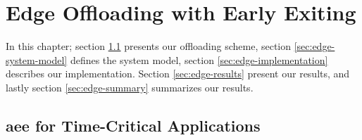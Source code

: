 \hypertarget{earlyexiting}{%
	\chapter{Edge Offloading with Early Exiting}\label{ch:edgeoffloading}}
\thispagestyle{fancy}

In this chapter; section \ref{sec:edge-aee} presents our offloading scheme, section \ref{sec:edge-system-model} defines the system model, section \ref{sec:edge-implementation} describes our implementation. Section \ref{sec:edge-results} present our results, and lastly section \ref{sec:edge-summary} summarizes our results.

\section{\acrfull{aee} for Time-Critical Applications} \label{sec:edge-aee}

